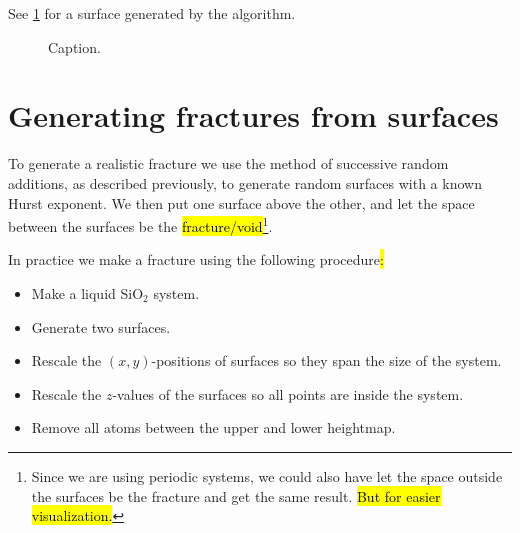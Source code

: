 See \cref{fig:diamond_square_surface} for a surface generated by the algorithm.

\begin{figure}
    \centering
    
    \caption{
        Caption.
        \label{fig:diamond_square_surface}
    }
\end{figure}



\section{Generating fractures from surfaces}
To generate a realistic fracture we use the method of successive random additions, as described previously, to generate random surfaces with a known Hurst exponent. We then put one surface above the other, and let the space between the surfaces be the \hl{fracture/void}\footnote{Since we are using periodic systems, we could also have let the space outside the surfaces be the fracture and get the same result. \hl{But for easier visualization.}}.

In practice we make a fracture using the following procedure\hl{:}
\begin{itemize}
    \item Make a liquid SiO$_2$ system.
    \item Generate two surfaces.
    \item Rescale the $(x,y)$-positions of surfaces so they span the size of the system.
    \item Rescale the $z$-values of the surfaces so all points are inside the system.
    \item Remove all atoms between the upper and lower heightmap.
\end{itemize}

